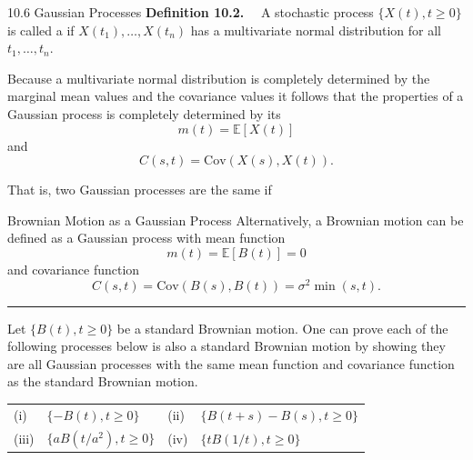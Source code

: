 \documentclass[letterpaper]{beamer}
\def\E{\mathbb E}
\def\CV{\mathrm{Cov}}
\begin{document}
\begin{frame}{10.6 Gaussian Processes}
\textbf{Definition 10.2.}~~
A stochastic process $\{X(t), t\ge 0\}$ is called a  if $X(t_1), \ldots ,X(t_n)$ has a multivariate normal distribution for all $t_1, \ldots , t_n.$\bigskip

Because a multivariate normal distribution is completely determined by the
marginal mean values and the covariance values it follows that the properties of a Gaussian process is completely determined by its  $$m(t)=\E[X(t)]$$ and  $$C(s,t)=\CV(X(s),X(t)).$$

That is, two Gaussian processes are the same if\medskip

\fboxrule=1pt
\fboxsep=6pt
\end{frame}
\begin{frame}{Brownian Motion as a Gaussian Process}
Alternatively, a Brownian motion can be defined as a Gaussian process
with mean function
$$m(t)=\E[B(t)]=0$$ and covariance function
$$C(s,t)=\CV(B(s),B(t))=\sigma^2\min(s,t).$$
\hrule\medskip
{}\par\smallskip

Let $\{B(t), t \ge 0\}$ be a standard Brownian motion.
One can prove each of the following processes below is also a standard Brownian motion
by showing they are all Gaussian processes with the same mean function and covariance function as the standard Brownian motion.
\begin{center}
\begin{tabular}{@{}l@{\;}l@{\qquad}l@{\;}l@{}}
(i) & $\{-B(t), t \ge 0\}$ & (ii) & $\{B(t+s)-B(s), t \ge 0\}$\\
(iii)&  $\{a B(t/a^2), t \ge 0\}$ & (iv)& $\{tB(1/t), t \ge 0\}$
\end{tabular}
\end{center}
\end{frame}
\end{document}
